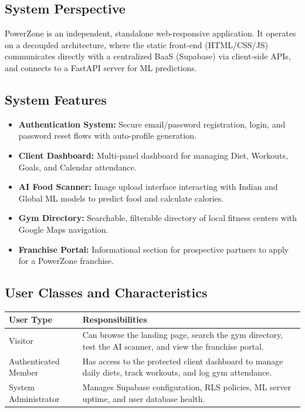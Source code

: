 \documentclass[12pt,a4paper]{article}
\begin{document}
\subsection{System Perspective}
PowerZone is an independent, standalone web-responsive application. It operates on a decoupled architecture, where the static front-end (HTML/CSS/JS) communicates directly with a centralized BaaS (Supabase) via client-side APIs, and connects to a FastAPI server for ML predictions.

\subsection{System Features}
\begin{itemize}
    \item \textbf{Authentication System:} Secure email/password registration, login, and password reset flows with auto-profile generation.
    \item \textbf{Client Dashboard:} Multi-panel dashboard for managing Diet, Workouts, Goals, and Calendar attendance.
    \item \textbf{AI Food Scanner:} Image upload interface interacting with Indian and Global ML models to predict food and calculate calories.
    \item \textbf{Gym Directory:} Searchable, filterable directory of local fitness centers with Google Maps navigation.
    \item \textbf{Franchise Portal:} Informational section for prospective partners to apply for a PowerZone franchise.
\end{itemize}

\subsection{User Classes and Characteristics}
\begin{longtable}{|p{4cm}|p{10cm}|}
\hline
\textbf{User Type} & \textbf{Responsibilities} \\
\hline
Visitor & Can browse the landing page, search the gym directory, test the AI scanner, and view the franchise portal. \\
\hline
Authenticated Member & Has access to the protected client dashboard to manage daily diets, track workouts, and log gym attendance. \\
\hline
System Administrator & Manages Supabase configuration, RLS policies, ML server uptime, and user database health. \\
\hline
\end{longtable}
\end{document}

